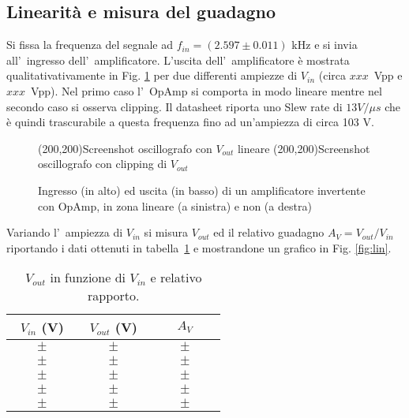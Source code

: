 \documentclass[10pt,a4paper]{article}
\newcommand{\exn}{\phantom{xxx}}
\begin{document}
	\subsection{Linearit\`a e misura del guadagno}
	Si fissa la frequenza del segnale ad $f_{in} = (2.597 \pm 0.011)$ kHz e si invia all'~ingresso dell'~amplificatore.	L'uscita dell'~amplificatore \`e mostrata qualitativativamente in Fig. \ref{fig:oscinv} per due 
	differenti ampiezze di $V_{in}$ (circa $xxx$~Vpp e $xxx$~Vpp). 
	Nel primo caso l'~OpAmp si comporta in modo lineare mentre nel secondo caso si osserva clipping. Il datasheet riporta uno Slew rate di $13 V/\mu s$ che è quindi trascurabile a questa frequenza fino ad un'ampiezza di circa 103 V.
	\begin{figure}[h]
		\begin{center}
			\framebox(200,200){Screenshot oscillografo con $V_{out}$ lineare}
			\framebox(200,200){Screenshot oscillografo con clipping di $V_{out}$}
		\end{center}
		\caption{\small Ingresso (in alto) ed uscita (in basso) di un amplificatore invertente con OpAmp, in 
			zona lineare (a sinistra) e non (a destra)}
		\label{fig:oscinv}
	\end{figure}
	
	Variando l'~ampiezza di $V_{in}$ si misura $V_{out}$ ed il relativo guadagno $A_V=V_{out}/V_{in}$ riportando i dati ottenuti in tabella~\ref{tab:guadagno} 
	e mostrandone un grafico in Fig. \ref{fig:lin}. 
	
	\begin{table}[h]
		\caption{$V_{out}$ in funzione di $V_{in}$ e relativo rapporto.}
		\label{tab:guadagno}
		\begin{center}
			\begin{tabular}{|c|c|c|}
				\hline
				$V_{in}$ (V) & $V_{out}$ (V)  & $A_V$ \\
				\hline
				\hline
				$\exn \pm \exn $ & $\exn \pm \exn $ & $\exn \pm \exn$ \\
				\hline
				$\exn \pm \exn $ & $\exn \pm \exn $ & $\exn \pm \exn $ \\
				\hline
				$\exn \pm \exn $ & $\exn \pm \exn $ & $\exn \pm \exn $ \\
				\hline
				$\exn \pm \exn $ & $\exn \pm \exn $ & $\exn \pm \exn $ \\
				\hline
				$\exn \pm \exn $ & $\exn \pm \exn $ & $\exn \pm \exn $ \\
				\hline
			\end{tabular}
		\end{center}
	\end{table}
	
\end{document}

